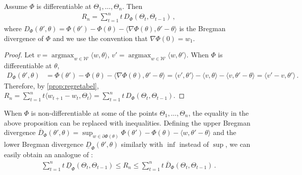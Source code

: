 \documentclass[english]{article}
\newcommand{\todoc}[2][]{\todo[color=Apricot!20,size=\tiny,#1]{C: #2}}
\newcommand{\cW}{\mathcal{W}}
\newcommand{\inpro}[2]{\langle #1, #2\rangle}
\newcommand{\ip}[1]{\langle#1\rangle}
\newcommand{\uD}{\overline{D}}
\newcommand{\lD}{\underline{D}}
\DeclareMathOperator*{\argmax}{argmax}
\begin{document}
\begin{proposition} 
\label{prop:R_nBregmanDivergence}
Assume $\Phi$ is differentiable at $\Theta_1, \ldots, \Theta_n$. Then %
\begin{align}
\label{eq:regreteq}
R_n = \sum_{t=1}^{n} t\,D_{\Phi}(\Theta_t,\Theta_{t-1})\,,
\end{align}
where $D_{\Phi}(\theta', \theta) = \Phi(\theta') - \Phi(\theta) - \ip{ \nabla\Phi(\theta), \theta' - \theta}$ is the Bregman divergence of $\Phi$
and
we use the convention that $\nabla\Phi(0) = w_1$.
\end{proposition}
\begin{proof}
Let $v = \argmax_{w\in\cW}\inpro{w}{\theta}$, 
$v' = \argmax_{w\in \cW}\ip{w,\theta'}$.
When $\Phi$ is differentiable at $\theta$,
\begin{align}
D_{\Phi}(\theta', \theta) & = \Phi(\theta') - \Phi(\theta) - \inpro{\nabla\Phi(\theta)}{\theta' \!- \theta} 
  =  \inpro{v'}{\theta'} \!- \inpro{v}{\theta} -\inpro{v}{\theta' \!- \theta} = \inpro{v'\!-v}{\theta'}\,. 
\label{eq:bregman}
\end{align}
Therefore, by \cref{prop:regretabel}, $R_n = \sum_{t=1}^{n} t\ip{ w_{t+1}-w_t,\Theta_t} = \sum_{t=1}^{n} t\,D_{\Phi}(\Theta_t,\Theta_{t-1})$.
\end{proof}

When $\Phi$ is non-differentiable at some of the points $\Theta_1,\dots,\Theta_n$, the equality in the above proposition can be replaced with inequalities.
Defining the upper Bregman divergence 
$\uD_{\Phi}(\theta', \theta) 
= \sup_{w\in \partial \Phi(\theta)} \Phi(\theta') - \Phi(\theta) - \ip{ w, \theta' - \theta}$ and the lower Bregman divergence $\lD_{\Phi}(\theta', \theta)$ similarly with $\inf$ instead of $\sup$, 
%
we can easily obtain an analogue of :
\begin{align}
\label{eq:regreteq_alt}
\sum_{t=1}^{n} t\,\lD_{\Phi}(\Theta_t,\Theta_{t-1})
\le
R_n 
\le \sum_{t=1}^{n} t\,\uD_{\Phi}(\Theta_t,\Theta_{t-1})\,.
\end{align}
\end{document}
